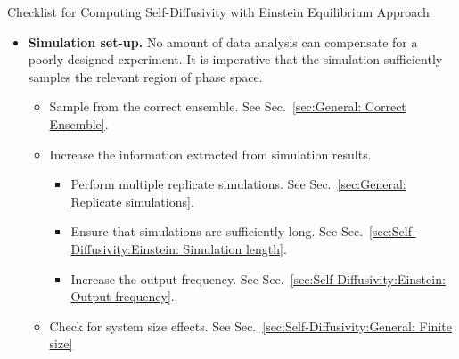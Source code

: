 \documentclass[9pt,bestpractices]{livecoms}
\begin{document}
\begin{Checklists*}[p!]
	\begin{checklist}{Checklist for Computing Self-Diffusivity with Einstein Equilibrium Approach}
		\begin{itemize}
			\item
			\textbf{Simulation set-up.} No amount of data analysis can compensate for a poorly designed experiment. It is imperative that the simulation sufficiently samples the relevant region of phase space.
			\begin{itemize}
				\item Sample from the correct ensemble. See Sec.\ \ref{sec:General: Correct Ensemble}.
				\item Increase the information extracted from simulation results.
				\begin{itemize}
					\item Perform multiple replicate simulations. See Sec.\ \ref{sec:General: Replicate simulations}.
					\item Ensure that simulations are sufficiently long. See Sec.\ \ref{sec:Self-Diffusivity:Einstein: Simulation length}.
					\item Increase the output frequency. See Sec.\ \ref{sec:Self-Diffusivity:Einstein: Output frequency}.
				\end{itemize}
				\item Check for system size effects. See Sec.\ \ref{sec:Self-Diffusivity:General: Finite size}
			\end{itemize}
			\vspace{-0.325\baselineskip} %


\end{itemize}
\end{checklist}
\end{Checklists*}
\end{document}

